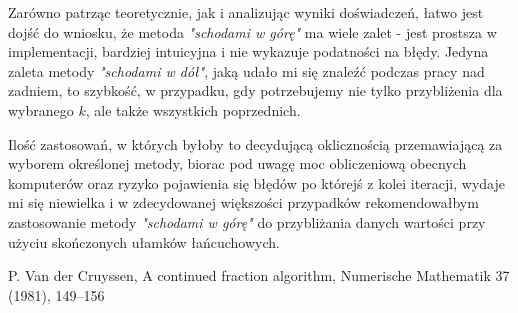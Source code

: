 \documentclass{article}
\begin{document}
Zarówno patrząc teoretycznie, jak i analizując wyniki doświadczeń, łatwo jest dojść do wniosku, że metoda \textit{"schodami w górę"} ma wiele zalet - jest prostsza w implementacji, bardziej intuicyjna i nie wykazuje podatności na błędy. Jedyna zaleta metody \textit{"schodami w dół"}, jaką udało mi się znaleźć podczas pracy nad zadniem, to szybkość, w przypadku, gdy potrzebujemy nie tylko przybliżenia dla wybranego $k$, ale także wszystkich poprzednich.

\newpage
Ilość zastosowań, w których byłoby to decydującą oklicznością przemawiającą za wyborem określonej metody, biorac pod uwagę moc obliczeniową obecnych komputerów oraz ryzyko pojawienia się błędów po którejś z kolei iteracji, wydaje mi się niewielka i w zdecydowanej większości przypadków rekomendowałbym zastosowanie metody \textit{"schodami w górę"} do przybliżania danych wartości przy użyciu skończonych ułamków łańcuchowych.

\begin{thebibliography}{99}
  P. Van der Cruyssen, A continued fraction algorithm, Numerische Mathematik 37 (1981), 149–156
\end{thebibliography}
\end{document}
